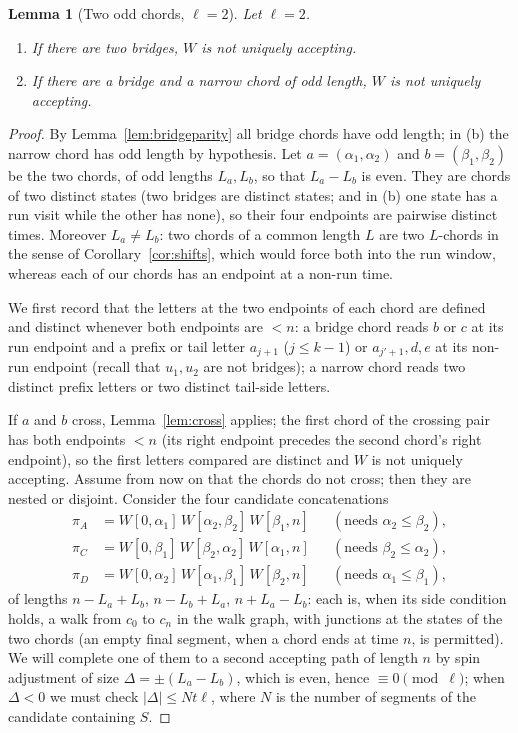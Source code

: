 \documentclass[11pt]{article}
\newtheorem{lemma}[theorem]{Lemma}
\theoremstyle{definition}
\begin{document}
\begin{lemma}[Two odd chords, $\ell=2$]\label{lem:twoodd}
Let $\ell=2$.
\begin{enumerate}[leftmargin=2.2em,itemsep=2pt,label=(\alph*)]
\item If there are two bridges, $W$ is not uniquely accepting.
\item If there are a bridge and a narrow chord of odd length, $W$ is not
uniquely accepting.
\end{enumerate}
\end{lemma}

\begin{proof}
By Lemma~\ref{lem:bridgeparity} all bridge chords have odd length; in (b)
the narrow chord has odd length by hypothesis. Let $a=(\alpha_1,\alpha_2)$
and $b=(\beta_1,\beta_2)$ be the two chords, of odd lengths $L_a,L_b$, so
that $L_a-L_b$ is even. They are chords of two distinct states (two bridges
are distinct states; and in (b) one state has a run visit while the other
has none), so their four endpoints are pairwise distinct times. Moreover
$L_a\ne L_b$: two chords of a common length $L$ are two $L$-chords in the
sense of Corollary~\ref{cor:shifts}, which would force both into the run
window, whereas each of our chords has an endpoint at a non-run time.

We first record that the letters at the two endpoints of each chord are
defined and distinct whenever both endpoints are $<n$: a bridge chord reads
$b$ or $c$ at its run endpoint and a prefix or tail letter
$a_{j+1}$ ($j\le k-1$) or $a_{j'+1},d,e$ at its non-run endpoint (recall
that $u_1,u_2$ are not bridges); a narrow chord reads two distinct prefix
letters or two distinct tail-side letters.

If $a$ and $b$ cross, Lemma~\ref{lem:cross} applies; the first chord of the
crossing pair has both endpoints $<n$ (its right endpoint precedes the
second chord's right endpoint), so the first letters compared are distinct
and $W$ is not uniquely accepting. Assume from now on that the chords do
not cross; then they are nested or disjoint. Consider the four candidate
concatenations
\begin{align*}
\pi_A&=W[0,\alpha_1]\,W[\alpha_2,\beta_2]\,W[\beta_1,n]&&(\text{needs }\alpha_2\le\beta_2),\\
\pi_C&=W[0,\beta_1]\,W[\beta_2,\alpha_2]\,W[\alpha_1,n]&&(\text{needs }\beta_2\le\alpha_2),\\
\pi_D&=W[0,\alpha_2]\,W[\alpha_1,\beta_1]\,W[\beta_2,n]&&(\text{needs }\alpha_1\le\beta_1),
\end{align*}
of lengths $n-L_a+L_b$, $n-L_b+L_a$, $n+L_a-L_b$: each is, when its side
condition holds, a walk from $c_0$ to $c_n$ in the walk graph, with
junctions at the states of the two chords (an empty final segment, when a
chord ends at time $n$, is permitted). We will complete one of them to a
second accepting path of length $n$ by spin adjustment of size
$\Delta=\pm(L_a-L_b)$, which is even, hence $\equiv0\pmod\ell$; when
$\Delta<0$ we must check $|\Delta|\le Nt\ell$, where $N$ is the number of
segments of the candidate containing $S$.


\end{proof}
\end{document}
